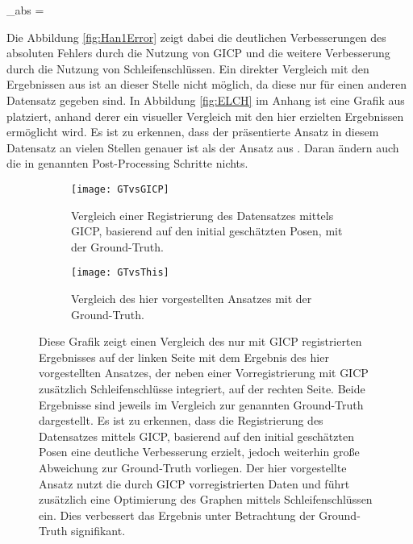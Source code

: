 \begin{myequation}
\varepsilon_{abs} = 
\end{myequation}

Die Abbildung \ref{fig:Han1Error} zeigt dabei die deutlichen Verbesserungen des absoluten Fehlers durch die Nutzung von GICP und die weitere Verbesserung durch die Nutzung von Schleifenschlüssen. Ein direkter Vergleich mit den Ergebnissen aus \cite{sprickerhof2011heuristic} ist an dieser Stelle nicht möglich, da diese nur für einen anderen Datensatz gegeben sind. In Abbildung \ref{fig:ELCH} im Anhang ist eine Grafik aus \cite{sprickerhof2011heuristic} platziert, anhand derer ein visueller Vergleich mit den hier erzielten Ergebnissen ermöglicht wird. Es ist zu erkennen, dass der präsentierte Ansatz in diesem Datensatz an vielen Stellen genauer ist als der Ansatz aus \cite{sprickerhof2011heuristic}. Daran ändern auch die in \cite{sprickerhof2011heuristic} genannten Post-Processing Schritte nichts.

\begin{figure}
	\centering
	\begin{subfigure}{.5\textwidth}
		 \centering
  		 \texttt{[image: GTvsGICP]}
  		 \centering \caption{Vergleich einer Registrierung des Datensatzes mittels GICP, basierend auf den initial geschätzten Posen, mit der Ground-Truth.}
  		 \label{fig:Han1Initial}
	\end{subfigure}%
	\begin{subfigure}{.5\textwidth}
    	\centering
  		\texttt{[image: GTvsThis]}
  		\centering \caption{Vergleich des hier vorgestellten Ansatzes mit der Ground-Truth.}
  		\label{fig:Han1GT}
	\end{subfigure}
	\caption{Diese Grafik zeigt einen Vergleich des nur mit GICP registrierten Ergebnisses auf der linken Seite mit dem Ergebnis des hier vorgestellten Ansatzes, der neben einer Vorregistrierung mit GICP zusätzlich Schleifenschlüsse integriert, auf der rechten Seite. Beide Ergebnisse sind jeweils im Vergleich zur genannten Ground-Truth dargestellt. Es ist zu erkennen, dass die Registrierung des Datensatzes mittels GICP, basierend auf den initial geschätzten Posen eine deutliche Verbesserung erzielt, jedoch weiterhin große Abweichung zur Ground-Truth vorliegen. Der hier vorgestellte Ansatz nutzt die durch GICP vorregistrierten Daten und führt zusätzlich eine Optimierung des Graphen mittels Schleifenschlüssen ein. Dies verbessert das Ergebnis unter Betrachtung der Ground-Truth signifikant.}
	\label{fig:Han1This}
\end{figure}


